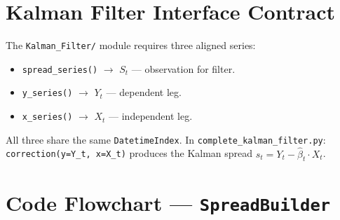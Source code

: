 \documentclass[10pt,a4paper,twocolumn]{article}
\begin{document}
\section{Kalman Filter Interface Contract}

The \texttt{Kalman\_Filter/} module requires three aligned series:

\begin{tcolorbox}[notebox={Interface: SpreadBuilder $\to$ Kalman}]
\begin{itemize}\setlength\itemsep{1pt}
  \item \texttt{spread\_series()} $\to$ $S_t$ — observation for filter.
  \item \texttt{y\_series()} $\to$ $Y_t$ — dependent leg.
  \item \texttt{x\_series()} $\to$ $X_t$ — independent leg.
\end{itemize}
All three share the same \texttt{DatetimeIndex}.
In \texttt{complete\_kalman\_filter.py}:\\
\texttt{correction(y=Y\_t, x=X\_t)} produces the Kalman spread
$s_t = Y_t - \hat\beta_t \cdot X_t$.
\end{tcolorbox}

\section{Code Flowchart --- \texttt{SpreadBuilder}}
\end{document}
